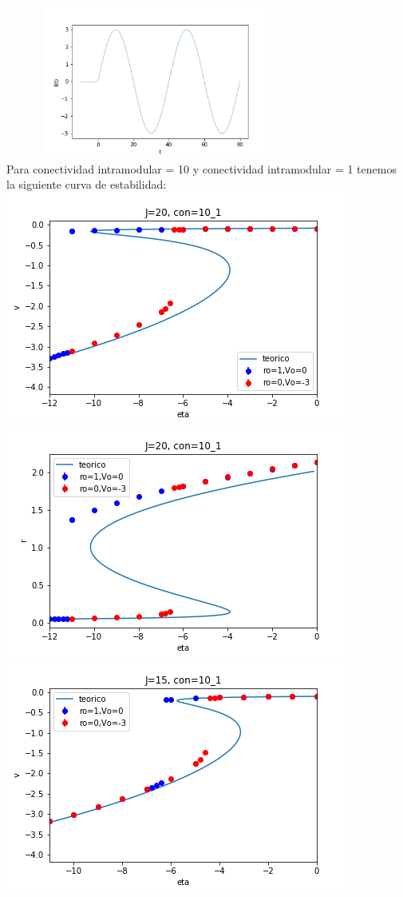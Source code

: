 \documentclass[a4paper]{article}
\begin{document}
\includegraphics[width=10cm,height=5cm]{current_seno.png}\\
Para conectividad intramodular = 10 y conectividad intramodular = 1 tenemos la siguiente curva de estabilidad:\\
\includegraphics[scale=0.7]{v_vs_eta_J20_mod10_1.png}\\
\includegraphics[scale=0.7]{r_vs_eta_J20_mod10_1.png}\\
\includegraphics[scale=0.7]{v_vs_eta_J15_mod10_1.png}\\
\end{document}

